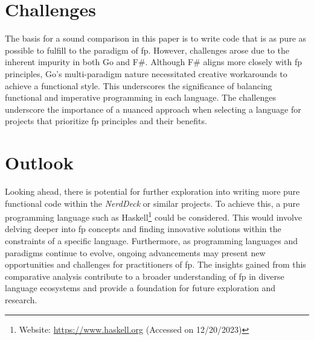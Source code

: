     \section{Challenges}\label{sec:challenges}
    The basis for a sound comparison in this paper is to write code that is as pure as possible to fulfill to the paradigm of \ac{fp}. However, challenges arose due to the inherent impurity in both Go and F\#. Although F\# aligns more closely with \ac{fp} principles, Go's multi-paradigm nature necessitated creative workarounds to achieve a functional style. This underscores the significance of balancing functional and imperative programming in each language. The challenges underscore the importance of a nuanced approach when selecting a language for projects that prioritize \ac{fp} principles and their benefits.        

    \section{Outlook}\label{sec:outlook}
    Looking ahead, there is potential for further exploration into writing more pure functional code within the \textit{NerdDeck} or similar projects. To achieve this, a pure programming language such as Haskell\footnote{Website: \url{https://www.haskell.org} (Accessed on 12/20/2023)} could be considered. This would involve delving deeper into \ac{fp} concepts and finding innovative solutions within the constraints of a specific language. Furthermore, as programming languages and paradigms continue to evolve, ongoing advancements may present new opportunities and challenges for practitioners of \ac{fp}. The insights gained from this comparative analysis contribute to a broader understanding of \ac{fp} in diverse language ecosystems and provide a foundation for future exploration and research.
